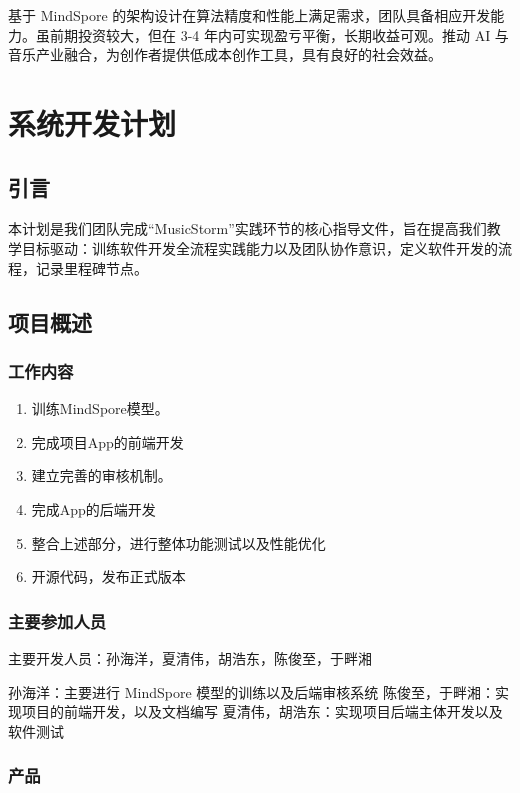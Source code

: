 \documentclass{base}
\numberwithin{figure}{section} %
\begin{document}
基于 MindSpore 的架构设计在算法精度和性能上满足需求，团队具备相应开发能力。虽前期投资较大，但在 3-4 年内可实现盈亏平衡，长期收益可观。推动 AI 与音乐产业融合，为创作者提供低成本创作工具，具有良好的社会效益。 
\newpage

\section{系统开发计划}

\subsection{引言}

本计划是我们团队完成“MusicStorm”实践环节的核心指导文件，旨在提高我们教学目标驱动：训练软件开发全流程实践能力以及团队协作意识​，定义软件开发的流程，记录里程碑节点。

\subsection{项目概述}

\subsubsection{工作内容}

\begin{enumerate}
    \item 训练MindSpore模型。
    \item 完成项目App的前端开发
    \item 建立完善的审核机制。
    \item 完成App的后端开发
    \item 整合上述部分，进行整体功能测试以及性能优化
    \item 开源代码，发布正式版本
\end{enumerate}

\subsubsection{主要参加人员}

主要开发人员：孙海洋，夏清伟，胡浩东，陈俊至，于畔湘

孙海洋：主要进行 MindSpore 模型的训练以及后端审核系统
陈俊至，于畔湘：实现项目的前端开发，以及文档编写
夏清伟，胡浩东：实现项目后端主体开发以及软件测试

\subsubsection{产品}
\end{document}
